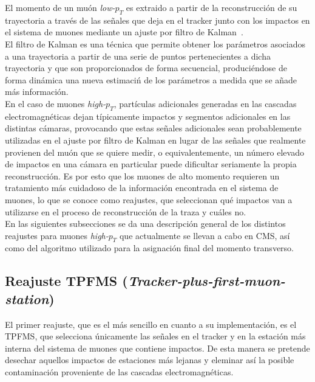 
El momento de un mu\'on \textit{low-$p_{T}$} es extraido a partir de la reconstrucci\'on de su trayectoria a trav\'es de las se\~nales que deja en el tracker junto con los impactos en el sistema de muones mediante un ajuste por filtro de Kalman~\cite{Kalman1960ANA}. \\
El filtro de Kalman es una t\'ecnica que permite obtener los par\'ametros asociados a una trayectoria a partir de una serie de puntos pertenecientes a dicha trayectoria y que son proporcionados de forma secuencial, produci\'endose de forma din\'amica una nueva estimaci\'n de los par\'ametros a medida que se a\~nade más informaci\'on. \\

En el caso de muones \textit{high-$p_{T}$}, part\'iculas adicionales generadas en las cascadas electromagn\'eticas dejan t\'ipicamente impactos y segmentos adicionales en las distintas c\'amaras, provocando que estas se\~nales adicionales sean probablemente utilizadas en el ajuste por filtro de Kalman en lugar de las se\~nales que realmente provienen del mu\'on que se quiere medir, o equivalentemente, un n\'umero elevado de impactos en una c\'amara en particular puede dificultar seriamente la propia reconstrucci\'on. Es por esto que los muones de alto momento requieren un tratamiento m\'as cuidadoso de la informaci\'on encontrada en el sistema de muones, lo que se conoce como reajustes, que seleccionan qu\'e impactos van a utilizarse en el proceso de reconstrucci\'on de la traza y cu\'ales no. \\

En las siguientes subsecciones se da una descripci\'on general de los distintos reajustes para muones \textit{high-$p_{T}$} que actualmente se llevan a cabo en CMS, as\'i como del algoritmo utilizado para la asignaci\'on final del momento transverso.

\subsection{Reajuste TPFMS (\textit{Tracker-plus-first-muon-station})}\label{sec:TPFMS}

El primer reajuste, que es el m\'as sencillo en cuanto a su implementaci\'on, es el TPFMS, que selecciona \'unicamente las se\~nales en el tracker y en la estaci\'on m\'as interna del sistema de muones que contiene impactos. De esta manera se pretende desechar aquellos impactos de estaciones m\'as lejanas y eleminar as\'i la posible contaminaci\'on proveniente de las cascadas electromagn\'eticas.

